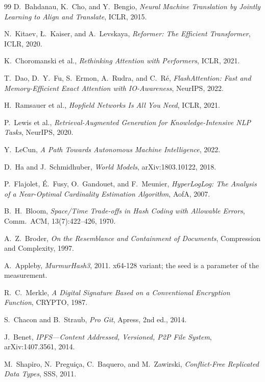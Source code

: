 \documentclass[11pt,a4paper]{article}
\theoremstyle{remark}
\begin{document}
\begin{thebibliography}{99}
 D.~Bahdanau, K.~Cho, and Y.~Bengio,
\textit{Neural Machine Translation by Jointly Learning to Align and Translate},
ICLR, 2015.

 N.~Kitaev, \L.~Kaiser, and A.~Levskaya,
\textit{Reformer: The Efficient Transformer}, ICLR, 2020.

 K.~Choromanski et al.,
\textit{Rethinking Attention with Performers}, ICLR, 2021.

 T.~Dao, D.~Y.~Fu, S.~Ermon, A.~Rudra, and C.~R\'e,
\textit{FlashAttention: Fast and Memory-Efficient Exact Attention with
IO-Awareness}, NeurIPS, 2022.

 H.~Ramsauer et al.,
\textit{Hopfield Networks Is All You Need}, ICLR, 2021.

 P.~Lewis et al.,
\textit{Retrieval-Augmented Generation for Knowledge-Intensive NLP Tasks},
NeurIPS, 2020.

 Y.~LeCun,
\textit{A Path Towards Autonomous Machine Intelligence}, 2022.

 D.~Ha and J.~Schmidhuber,
\textit{World Models}, arXiv:1803.10122, 2018.

 P.~Flajolet, \'E.~Fusy, O.~Gandouet, and F.~Meunier,
\textit{HyperLogLog: The Analysis of a Near-Optimal Cardinality Estimation
Algorithm}, AofA, 2007.

 B.~H.~Bloom,
\textit{Space/Time Trade-offs in Hash Coding with Allowable Errors},
Comm.\ ACM, 13(7):422--426, 1970.

 A.~Z.~Broder,
\textit{On the Resemblance and Containment of Documents}, Compression and
Complexity, 1997.

 A.~Appleby,
\textit{MurmurHash3}, 2011. x64-128 variant; the seed is a parameter of the
measurement.

 R.~C.~Merkle,
\textit{A Digital Signature Based on a Conventional Encryption Function},
CRYPTO, 1987.

 S.~Chacon and B.~Straub,
\textit{Pro Git}, Apress, 2nd ed., 2014.

 J.~Benet,
\textit{IPFS---Content Addressed, Versioned, P2P File System},
arXiv:1407.3561, 2014.

 M.~Shapiro, N.~Pregui\c{c}a, C.~Baquero, and
M.~Zawirski,
\textit{Conflict-Free Replicated Data Types}, SSS, 2011.


\end{thebibliography}
\end{document}
